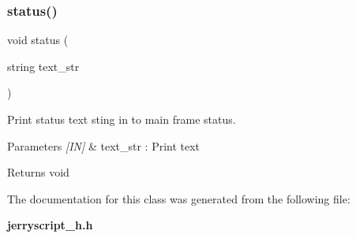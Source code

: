 \subsubsection{status()}
{\footnotesize\ttfamily void status (\begin{DoxyParamCaption}\item[{string}]{text\+\_\+str }\end{DoxyParamCaption})}



Print status text sting in to main frame status. 


\begin{DoxyCode}{0}
\end{DoxyCode}



\begin{DoxyParams}{Parameters}
{\em \mbox{[}\+I\+N\mbox{]}} & text\+\_\+str \+: Print text \\
\hline
\end{DoxyParams}
\begin{DoxyReturn}{Returns}
void 
\end{DoxyReturn}


The documentation for this class was generated from the following file\+:\begin{DoxyCompactItemize}
\item 
\textbf{ jerryscript\+\_\+h.\+h}\end{DoxyCompactItemize}
